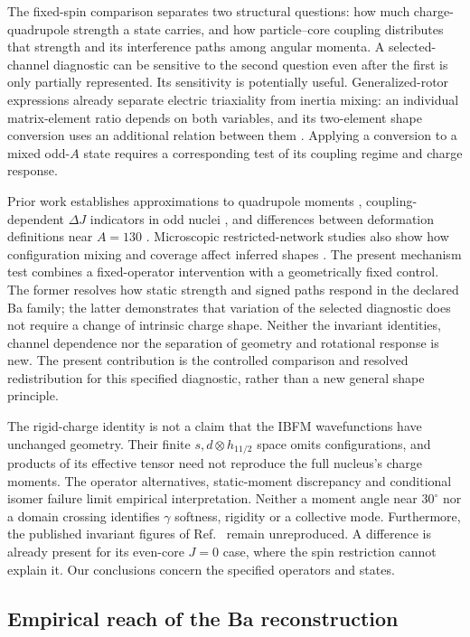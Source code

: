 \documentclass[pdflatex,iicol,sn-mathphys-num]{sn-jnl}
\begin{document}
The fixed-spin comparison separates two structural questions: how much charge-quadrupole strength a state carries, and how particle--core coupling distributes that strength and its interference paths among angular momenta. A selected-channel diagnostic can be sensitive to the second question even after the first is only partially represented. Its sensitivity is potentially useful. Generalized-rotor expressions already separate electric triaxiality from inertia mixing: an individual matrix-element ratio depends on both variables, and its two-element shape conversion uses an additional relation between them \cite{LawrieOrce2025}. Applying a conversion to a mixed odd-$A$ state requires a corresponding test of its coupling regime and charge response.

Prior work establishes approximations to quadrupole moments \cite{Werner2005,Henderson2020}, coupling-dependent $\Delta J$ indicators in odd nuclei \cite{Nomura2016}, and differences between deformation definitions near $A=130$ \cite{Bally2022}. Microscopic restricted-network studies also show how configuration mixing and coverage affect inferred shapes \cite{Rouoof2025}. The present mechanism test combines a fixed-operator intervention with a geometrically fixed control. The former resolves how static strength and signed paths respond in the declared Ba family; the latter demonstrates that variation of the selected diagnostic does not require a change of intrinsic charge shape. Neither the invariant identities, channel dependence nor the separation of geometry and rotational response is new. The present contribution is the controlled comparison and resolved redistribution for this specified diagnostic, rather than a new general shape principle.

The rigid-charge identity is not a claim that the IBFM wavefunctions have
unchanged geometry. Their finite $s,d\otimes h_{11/2}$ space omits
configurations, and products of its effective tensor need not reproduce
the full nucleus's charge moments. The operator alternatives, static-moment
discrepancy and conditional isomer failure limit empirical interpretation.
Neither a moment angle near $30^\circ$ nor a domain crossing identifies
$\gamma$ softness, rigidity or a collective mode.
Furthermore, the published invariant figures of Ref.~\cite{Nomura2017}
remain unreproduced. A difference is already present for its even-core
$J=0$ case, where the spin restriction cannot explain it.
Our conclusions concern the specified operators and states.

\subsection{Empirical reach of the Ba reconstruction}\label{sec:isomer}
\end{document}
